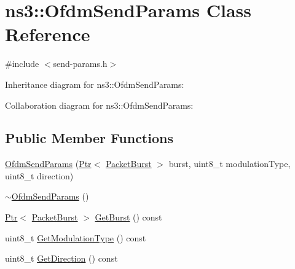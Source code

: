 \hypertarget{classns3_1_1OfdmSendParams}{}\section{ns3\+:\+:Ofdm\+Send\+Params Class Reference}
\label{classns3_1_1OfdmSendParams}


{\ttfamily \#include $<$send-\/params.\+h$>$}



Inheritance diagram for ns3\+:\+:Ofdm\+Send\+Params\+:


Collaboration diagram for ns3\+:\+:Ofdm\+Send\+Params\+:
\subsection*{Public Member Functions}
\begin{DoxyCompactItemize}
\item 
\hyperlink{classns3_1_1OfdmSendParams_af9939d1921d0520d5eef1ac8608904d5}{Ofdm\+Send\+Params} (\hyperlink{classns3_1_1Ptr}{Ptr}$<$ \hyperlink{classns3_1_1PacketBurst}{Packet\+Burst} $>$ burst, uint8\+\_\+t modulation\+Type, uint8\+\_\+t direction)
\item 
\hyperlink{classns3_1_1OfdmSendParams_ade2c234375ee70652b9d6955f64b610d}{$\sim$\+Ofdm\+Send\+Params} ()
\item 
\hyperlink{classns3_1_1Ptr}{Ptr}$<$ \hyperlink{classns3_1_1PacketBurst}{Packet\+Burst} $>$ \hyperlink{classns3_1_1OfdmSendParams_ae8a0e50f0c58eefed2edcdca2f8d03b1}{Get\+Burst} () const 
\item 
uint8\+\_\+t \hyperlink{classns3_1_1OfdmSendParams_ad8cede67eb30dc14977d96d814830142}{Get\+Modulation\+Type} () const 
\item 
uint8\+\_\+t \hyperlink{classns3_1_1OfdmSendParams_af0aa433d21b373f0a60158afcb7f1f30}{Get\+Direction} () const 
\end{DoxyCompactItemize}
